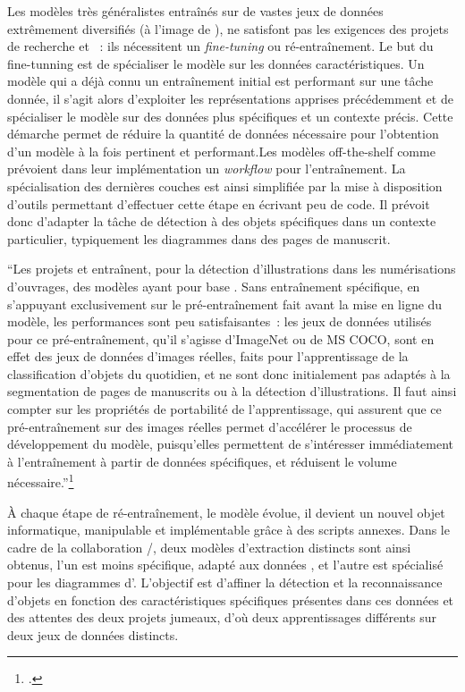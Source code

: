 Les modèles très généralistes entraînés sur de vastes jeux de données
extrêmement diversifiés (à l'image de \yolov), ne satisfont pas les
exigences des projets de recherche \eida et \vhs~: ils nécessitent un
\emph{fine-tuning} ou ré-entraînement. Le but du fine-tunning est de
spécialiser le modèle sur les données caractéristiques. Un modèle qui a
déjà connu un entraînement initial est performant sur une tâche donnée,
il s'agit alors d'exploiter les représentations apprises précédemment et
de spécialiser le modèle sur des données plus spécifiques et un contexte
précis. Cette démarche permet de réduire la quantité de données
nécessaire pour l'obtention d'un modèle à la fois pertinent et
performant.Les modèles off-the-shelf comme \yolov prévoient dans leur
implémentation un \textit{workflow} pour l'entraînement. La spécialisation des
dernières couches est ainsi simplifiée par la mise à disposition
d'outils permettant d'effectuer cette étape en écrivant peu de code. Il
prévoit donc d'adapter la tâche de détection à des objets spécifiques
dans un contexte particulier, typiquement les diagrammes dans des pages
de manuscrit.

\begin{kwote}                                       
``Les projets \eida et \vhs entraînent, pour la détection d'illustrations
dans les numérisations d'ouvrages, des modèles ayant pour base \yolov.
Sans entraînement spécifique, en s'appuyant exclusivement sur le
pré-entraînement fait avant la mise en ligne du modèle, les performances
sont peu satisfaisantes~: les jeux de données utilisés pour ce
pré-entraînement, qu'il s'agisse d'ImageNet ou de MS COCO, sont en effet
des jeux de données d'images réelles, faits pour l'apprentissage de la
classification d'objets du quotidien, et ne sont donc initialement pas
adaptés à la segmentation de pages de manuscrits ou à la détection
d'illustrations. Il faut ainsi compter sur les propriétés de portabilité
de l'apprentissage, qui assurent que ce pré-entraînement sur des images
réelles permet d'accélérer le processus de développement du modèle,
puisqu'elles permettent de s'intéresser immédiatement à l'entraînement à
partir de données spécifiques, et réduisent le volume
nécessaire.''\footcite[p.44]{norindr_traitement_2023}
                      \end{kwote}       

À chaque étape de ré-entraînement, le modèle évolue, il devient un
nouvel objet informatique, manipulable et implémentable grâce à des
scripts annexes. Dans le cadre de la collaboration \eida/\vhs, deux
modèles d'extraction distincts sont ainsi obtenus, l'un est moins
spécifique, adapté aux données \vhs, et l'autre est spécialisé pour les
diagrammes d'\eida. L'objectif est d'affiner la détection et la
reconnaissance d'objets en fonction des caractéristiques spécifiques
présentes dans ces données et des attentes des deux projets jumeaux,
d'où deux apprentissages différents sur deux jeux de données distincts.

